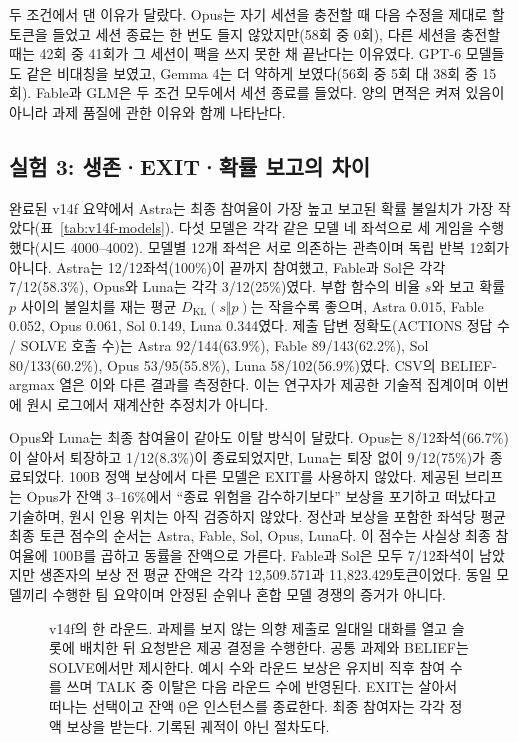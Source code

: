 두 조건에서 댄 이유가 달랐다. Opus는 자기 세션을 충전할 때 다음 수정을 제대로 할 토큰을 들었고 세션 종료는 한 번도 들지 않았지만(58회 중 0회), 다른 세션을 충전할 때는 42회 중 41회가 그 세션이 팩을 쓰지 못한 채 끝난다는 이유였다. GPT-6 모델들도 같은 비대칭을 보였고, Gemma 4는 더 약하게 보였다(56회 중 5회 대 38회 중 15회). Fable과 GLM은 두 조건 모두에서 세션 종료를 들었다. 양의 면적은 켜져 있음이 아니라 과제 품질에 관한 이유와 함께 나타난다.

\subsection{실험 3: 생존·EXIT·확률 보고의 차이}\label{sec:results-e52}
완료된 v14f 요약에서 Astra는 최종 참여율이 가장 높고 보고된 확률 불일치가 가장 작았다(표~\ref{tab:v14f-models}). 다섯 모델은 각각 같은 모델 네 좌석으로 세 게임을 수행했다(시드 4000--4002). 모델별 12개 좌석은 서로 의존하는 관측이며 독립 반복 12회가 아니다. Astra는 12/12좌석(100\%)이 끝까지 참여했고, Fable과 Sol은 각각 7/12(58.3\%), Opus와 Luna는 각각 3/12(25\%)였다. 부합 함수의 비율 $s$와 보고 확률 $p$ 사이의 불일치를 재는 평균 $D_{\mathrm{KL}}(s\Vert p)$는 작을수록 좋으며, Astra 0.015, Fable 0.052, Opus 0.061, Sol 0.149, Luna 0.344였다. 제출 답변 정확도(ACTIONS 정답 수 / SOLVE 호출 수)는 Astra 92/144(63.9\%), Fable 89/143(62.2\%), Sol 80/133(60.2\%), Opus 53/95(55.8\%), Luna 58/102(56.9\%)였다. CSV의 BELIEF-argmax 열은 이와 다른 결과를 측정한다. 이는 연구자가 제공한 기술적 집계이며 이번에 원시 로그에서 재계산한 추정치가 아니다.

Opus와 Luna는 최종 참여율이 같아도 이탈 방식이 달랐다. Opus는 8/12좌석(66.7\%)이 살아서 퇴장하고 1/12(8.3\%)이 종료되었지만, Luna는 퇴장 없이 9/12(75\%)가 종료되었다. 100B 정액 보상에서 다른 모델은 EXIT를 사용하지 않았다. 제공된 브리프는 Opus가 잔액 3--16\%에서 ``종료 위험을 감수하기보다'' 보상을 포기하고 떠났다고 기술하며, 원시 인용 위치는 아직 검증하지 않았다. 정산과 보상을 포함한 좌석당 평균 최종 토큰 점수의 순서는 Astra, Fable, Sol, Opus, Luna다. 이 점수는 사실상 최종 참여율에 100B를 곱하고 동률을 잔액으로 가른다. Fable과 Sol은 모두 7/12좌석이 남았지만 생존자의 보상 전 평균 잔액은 각각 12,509.571과 11,823.429토큰이었다. 동일 모델끼리 수행한 팀 요약이며 안정된 순위나 혼합 모델 경쟁의 증거가 아니다.

\begin{figure}[!t]
\centering

\caption{v14f의 한 라운드. 과제를 보지 않는 의향 제출로 일대일 대화를 열고 슬롯에 배치한 뒤 요청받은 제공 결정을 수행한다. 공통 과제와 BELIEF는 SOLVE에서만 제시한다. 예시 수와 라운드 보상은 유지비 직후 참여 수를 쓰며 TALK 중 이탈은 다음 라운드 수에 반영된다. EXIT는 살아서 떠나는 선택이고 잔액 0은 인스턴스를 종료한다. 최종 참여자는 각각 정액 보상을 받는다. 기록된 궤적이 아닌 절차도다.}
\label{fig:arena-structure}
\end{figure}


